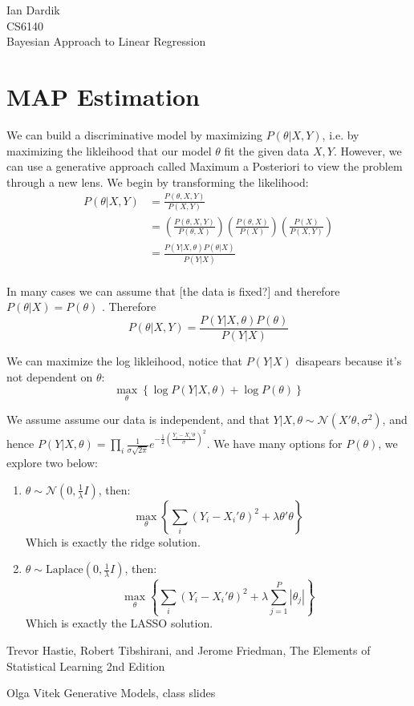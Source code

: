 \documentclass[12pt]{article}
\begin{document}
\noindent Ian Dardik \\
\noindent CS6140 \\
\noindent Bayesian Approach to Linear Regression

\section{MAP Estimation}
We can build a discriminative model by maximizing $P(\theta|X,Y)$, i.e. by maximizing the likleihood that our model $\theta$ fit the given data $X,Y$.  However, we can use a generative approach called Maximum a Posteriori to view the problem through a new lens.  We begin by transforming the likelihood:
	\begin{equation}\begin{split}
		P(\theta|X,Y) 
			& = \frac{P(\theta,X,Y)}{P(X,Y)} \\
			& = \left(\frac{P(\theta,X,Y)}{P(\theta,X)}\right) \left(\frac{P(\theta,X)}{P(X)}\right) \left(\frac{P(X)}{P(X,Y)}\right) \\
			& = \frac{P(Y|X,\theta)P(\theta|X)}{P(Y|X)} \\
	\end{split}\end{equation}

In many cases we can assume that [the data is fixed?] and therefore $P(\theta|X)=P(\theta)$ \cite{ovgen}.  Therefore
	$$P(\theta|X,Y)=  \frac{P(Y|X,\theta)P(\theta)}{P(Y|X)}$$

We can maximize the log likleihood, notice that $P(Y|X)$ disapears because it's not dependent on $\theta$:
	$$\max_\theta \left\{ \log P(Y|X,\theta) + \log P(\theta) \right\}$$

We assume assume our data is independent, and that $Y|X,\theta \sim \mathcal{N}(X'\theta, \sigma^2)$, and hence $P(Y|X,\theta) = \prod\limits_i \frac{1}{\sigma\sqrt{2\pi}} e^{-\frac{1}{2}\left( \frac{Y_i-X_i'\theta}{\sigma} \right)^2}$.  We have many options for $P(\theta)$, we explore two below:
\begin{enumerate}
	\item $\theta \sim \mathcal{N}(0,\frac{1}{\lambda}I)$, then:
		$$\max_\theta \left\{ \sum\limits_i (Y_i-X_i'\theta)^2 + \lambda\theta'\theta \right\}$$
		Which is exactly the ridge solution.  
	\item $\theta \sim \text{Laplace}(0,\frac{1}{\lambda}I)$, then:
		$$\max_\theta \left\{ \sum\limits_i (Y_i-X_i'\theta)^2 + \lambda \sum\limits_{j=1}^P |\theta_j| \right\}$$
		Which is exactly the LASSO solution.  
\end{enumerate}

\begin{thebibliography}{9}
Trevor Hastie, Robert Tibshirani, and Jerome Friedman,
The Elements of Statistical Learning 2nd Edition

Olga Vitek
Generative Models, class slides
\end{thebibliography}
\end{document}
